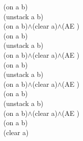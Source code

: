 {{(on a b)\\
(unstack a b)\\
(on a b)$\wedge$(clear a)$\wedge$(AE )\\
(on a b)\\
(unstack a b)\\
(on a b)$\wedge$(clear a)$\wedge$(AE )\\
(on a b)\\
(unstack a b)\\
(on a b)$\wedge$(clear a)$\wedge$(AE )\\
(on a b)\\
(unstack a b)\\
(on a b)$\wedge$(clear a)$\wedge$(AE )\\
(on a b)\\
(clear a)\\
}%
}

